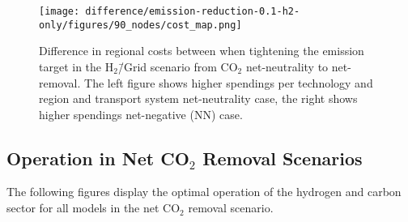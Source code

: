 \documentclass[twocolumn]{article}
\newcommand{\carbon}{CO$_2$}
\newcommand{\hydrogengrid}{H$_2$\=/Grid}
\newcommand{\hydrogenscenario}{H$_2$\=/Grid scenario}
\newcommand{\hybridscenario}{Hybrid scenario}
\begin{document}
\begin{figure}[ht!]
    \centering
    \texttt{[image: difference/emission-reduction-0.1-h2-only/figures/90\_nodes/cost\_map.png]}
    \caption{Difference in regional costs between when tightening the emission target in the \hydrogenscenario{} from \carbon{} net-neutrality to net-removal. The left figure shows higher spendings per technology and region and transport system net-neutrality case, the right shows higher spendings net-negative (NN) case.}
    \label{fig:cost_map_difference_h2_nn}
\end{figure}









\clearpage
\subsection{Operation in Net \carbon{} Removal Scenarios}
\label{sec:operation_nn}
The following figures display the optimal operation of the hydrogen and carbon sector for all models in the net \carbon{} removal scenario.
\end{document}
